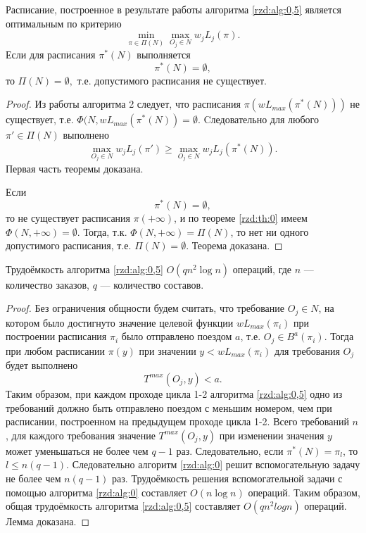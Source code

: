 \begin{theorem} \label{rzd:th:0,5}
Расписание, построенное в результате работы алгоритма \ref{rzd:alg:0,5} является оптимальным по критерию
\begin{equation*}
  \min\limits_{\pi \in \Pi(N)}\max\limits_{O_j\in N}w_j L_j(\pi).
\end{equation*}
Если для расписания $\pi^{*}(N)$ выполняется
$$\pi^{*}(N) = \emptyset,$$
то $\Pi(N) = \emptyset,$ т.е. допустимого расписания не существует.
\end{theorem}
\begin{proof}
Из работы алгоритма 2 следует, что расписания $\pi(wL_{max}(\pi^{*}(N)))$ не существует, т.е. $\Phi(N,wL_{max}(\pi^{*}(N)) = \emptyset$. Cледовательно для любого $\pi' \in \Pi(N)$ выполнено
$$ \max\limits_{O_j\in N}w_j L_j(\pi') \geq \max\limits_{O_j\in N}w_j L_j(\pi^{*}(N)).$$
Первая часть теоремы доказана.

Если $$\pi^{*}(N) = \emptyset,$$ то не существует расписания $\pi(+\infty)$, и по теореме \ref{rzd:th:0} имеем $\Phi(N, +\infty) = \emptyset$.  Тогда, т.к. $\Phi(N, +\infty) = \Pi(N)$, то нет ни одного допустимого расписания, т.е. $\Pi(N) = \emptyset$. Теорема доказана.
\end{proof}

\begin{lemma}\label{rzd:lm:0,5}
Трудоёмкость алгоритма \ref{rzd:alg:0,5} $O(q n^2 \log n)$ операций, где $n$ --- количество заказов, $q$ --- количество составов.
\end{lemma}
\begin{proof}
 Без ограничения общности будем считать, что требование $O_j \in N$, на котором было достигнуто значение целевой функции $wL_{max}(\pi_i)$ при построении расписания $\pi_i$ было отправлено поездом $a$, т.е. $O_j \in B^a(\pi_i)$. Тогда при любом расписании $\pi(y)$ при значении $y < wL_{max}(\pi_i)$ для требования $O_j$  будет выполнено
$$T^{max}(O_j,y) < a.$$
Таким образом, при каждом проходе цикла 1-2 алгоритма \ref{rzd:alg:0,5} одно из требований должно быть отправлено поездом с меньшим номером, чем при расписании, построенном на предыдущем проходе цикла 1-2. Всего требований $n$, для каждого требования значение $T^{max}(O_j,y)$ при изменении значения $y$ может уменьшаться не более чем $q-1$ раз.
Следовательно, если $\pi^{*}(N) = \pi_l$, то $l \leq n(q-1)$. Следовательно алгоритм \ref{rzd:alg:0} решит вспомогательную задачу не более чем $n(q-1)$ раз. Трудоёмкость решения вспомогательной задачи с помощью алгоритма \ref{rzd:alg:0} составляет $O(n \log n)$ операций. Таким образом, общая трудоёмкость алгоритма \ref{rzd:alg:0,5} составляет $O(q n^2 log n)$ операций. Лемма доказана.
\end{proof}

